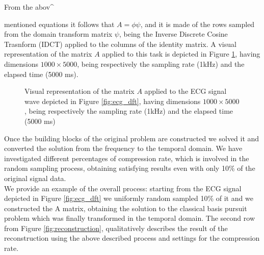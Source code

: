 \documentclass[journal,article,submit,electronics,pdftex]{Definitions/mdpi}
\begin{document}
From the abov^{mentioned equations it follows that $A = \phi \psi$, and it is made of the rows sampled from the domain transform matrix $\psi$, being the Inverse Discrete Cosine Trasnform (IDCT) applied to the columns of the identity matrix.
A visual representation of the matrix $A$ applied to this task is depicted in Figure \ref{fig:amatrix}, having dimensions $1000 \times 5000$, being respectively the sampling rate (1kHz) and the elapsed time (5000 ms).
\begin{figure}[H]
\centering
{}
\caption{Visual representation of the matrix $A$ applied to the ECG signal wave depicted in Figure \ref{fig:ecg_dft}, having dimensions $1000 \times 5000$, being respectively the sampling rate (1kHz) and the elapsed time (5000 ms)}
\label{fig:amatrix}
\end{figure}

Once the building blocks of the original problem are constructed we solved it and converted the solution from the frequency to the temporal domain. We have investigated different percentages of compression rate, which is involved in the random sampling process, obtaining satisfying results even with only 10\% of the original signal data.\\ We provide an example of the overall process: starting from the ECG signal depicted in Figure \ref{fig:ecg_dft} we uniformly random sampled 10\% of it and we constructed the A matrix, obtaining the solution to the classical basis pursuit problem which was finally transformed in the temporal domain. The second row from Figure \ref{fig:reconstruction}, qualitatively describes the result of the reconstruction using the above described process and settings for the compression rate.

}
\end{document}
